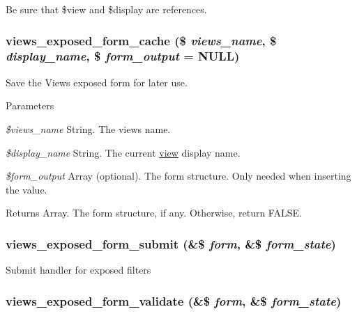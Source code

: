 Be sure that \$view and \$display are references. \hypertarget{views_8module_a5db0d5532dfe2507275360e0738e4d64}{
\subsubsection[{views\_\-exposed\_\-form\_\-cache}]{\setlength{\rightskip}{0pt plus 5cm}views\_\-exposed\_\-form\_\-cache (\$ {\em views\_\-name}, \/  \$ {\em display\_\-name}, \/  \$ {\em form\_\-output} = {\ttfamily NULL})}}
\label{views_8module_a5db0d5532dfe2507275360e0738e4d64}
Save the Views exposed form for later use.


\begin{DoxyParams}{Parameters}
\item[{\em \$views\_\-name}]String. The views name. \item[{\em \$display\_\-name}]String. The current \hyperlink{classview}{view} display name. \item[{\em \$form\_\-output}]Array (optional). The form structure. Only needed when inserting the value. \end{DoxyParams}
\begin{DoxyReturn}{Returns}
Array. The form structure, if any. Otherwise, return FALSE. 
\end{DoxyReturn}
\hypertarget{views_8module_a931d81415d29b2c8bb3ec3a2e9edbfea}{
\subsubsection[{views\_\-exposed\_\-form\_\-submit}]{\setlength{\rightskip}{0pt plus 5cm}views\_\-exposed\_\-form\_\-submit (\&\$ {\em form}, \/  \&\$ {\em form\_\-state})}}
\label{views_8module_a931d81415d29b2c8bb3ec3a2e9edbfea}
Submit handler for exposed filters \hypertarget{views_8module_aabe2634331d3b98e6f229d3392d2b5ce}{
\subsubsection[{views\_\-exposed\_\-form\_\-validate}]{\setlength{\rightskip}{0pt plus 5cm}views\_\-exposed\_\-form\_\-validate (\&\$ {\em form}, \/  \&\$ {\em form\_\-state})}}

